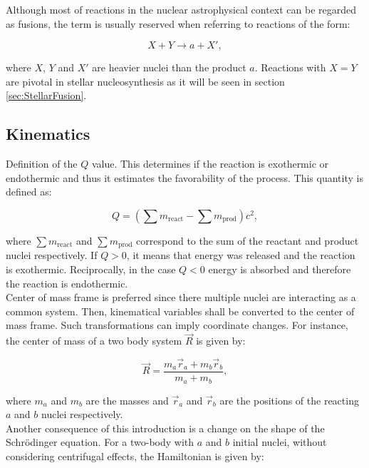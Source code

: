\documentclass[openany]{book}
\begin{document}
Although most of reactions in the nuclear astrophysical context can be regarded as fusions, the term is usually reserved when referring to reactions of the form:

\begin{equation}  \label{eq:nuclearReaction_fusion}
	X + Y \rightarrow a + X',
\end{equation}

where $X$, $Y$ and $X'$ are heavier nuclei than the product $a$. Reactions with $X = Y$ are pivotal in stellar nucleosynthesis as it will be seen in section \ref{sec:StellarFusion}.

\subsection{Kinematics} \label{sub:kinematics}

Definition of the $Q$ value. This determines if the reaction is exothermic or endothermic and thus it estimates the favorability of the process. This quantity is defined as: 

\begin{equation}\label{eq:nuclearReaction_Qvalue}
	Q = (\sum m_{\mathrm{react}} - \sum m_{\mathrm{prod}})c^2,
\end{equation}

where $\sum m_{\mathrm{react}}$ and  $\sum m_{\mathrm{prod}}$ correspond to the sum of the reactant and product nuclei respectively. If $Q > 0$, it means that energy was released and the reaction is exothermic. Reciprocally, in the case $Q < 0$ energy is absorbed and therefore the reaction is endothermic.  \\

Center of mass frame is preferred since there multiple nuclei are interacting as a common system. Then, kinematical variables shall be converted to the center of mass frame. Such transformations can imply coordinate changes. For instance, the center of mass of a two body system $\vec R$ is given by: 

\begin{equation}\label{eq:nuclearReaction_centerOfMass}
	\vec R = \frac{m_a \vec r_a + m_b \vec r_b}{m_a + m_b},
\end{equation}

where $m_a$ and $m_b$ are the masses and $\vec r_a $ and $\vec r_b$ are the positions of the reacting $a$ and $b$ nuclei respectively. \\

Another consequence of this introduction is a change on the shape of the Schrödinger equation. For a two-body with $a$ and $b$ initial nuclei, without considering centrifugal effects, the Hamiltonian is given by: 
\end{document}
